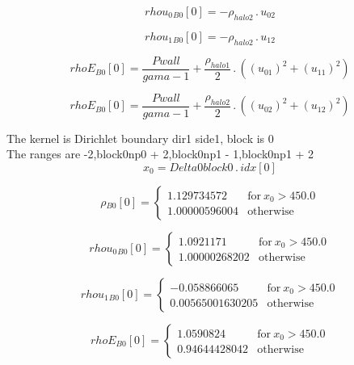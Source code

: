 \documentclass{article}
\begin{document}
\begin{dmath}{rhou_{0}{_{B0}}}[{0}] = - \rho_{halo 2} \,.\, u_{02}\end{dmath}

\begin{dmath}{rhou_{1}{_{B0}}}[{0}] = - \rho_{halo 2} \,.\, u_{12}\end{dmath}

\begin{dmath}{rhoE{_{B0}}}[{0}] = \frac{Pwall}{gama - 1} + \frac{\rho_{halo 1}}{2} \,.\, \left(\left(u_{01} \right)^{2} + \left(u_{11} \right)^{2}\right)\end{dmath}

\begin{dmath}{rhoE{_{B0}}}[{0}] = \frac{Pwall}{gama - 1} + \frac{\rho_{halo 2}}{2} \,.\, \left(\left(u_{02} \right)^{2} + \left(u_{12} \right)^{2}\right)\end{dmath}

\noindent The kernel is Dirichlet boundary dir1 side1, block is 0\\\noindent The ranges are -2,block0np0 + 2,block0np1 - 1,block0np1 + 2\\\begin{dmath}x_{0} = Delta0block0 \,.\, {idx}[{0}]\end{dmath}

\begin{dmath}{\rho{_{B0}}}[{0}] = \begin{cases} 1.129734572 & \text{for}\: x_{0} > 450.0 \\1.00000596004 & \text{otherwise} \end{cases}\end{dmath}

\begin{dmath}{rhou_{0}{_{B0}}}[{0}] = \begin{cases} 1.0921171 & \text{for}\: x_{0} > 450.0 \\1.00000268202 & \text{otherwise} \end{cases}\end{dmath}

\begin{dmath}{rhou_{1}{_{B0}}}[{0}] = \begin{cases} -0.058866065 & \text{for}\: x_{0} > 450.0 \\0.00565001630205 & \text{otherwise} \end{cases}\end{dmath}

\begin{dmath}{rhoE{_{B0}}}[{0}] = \begin{cases} 1.0590824 & \text{for}\: x_{0} > 450.0 \\0.94644428042 & \text{otherwise} \end{cases}\end{dmath}
\end{document}
